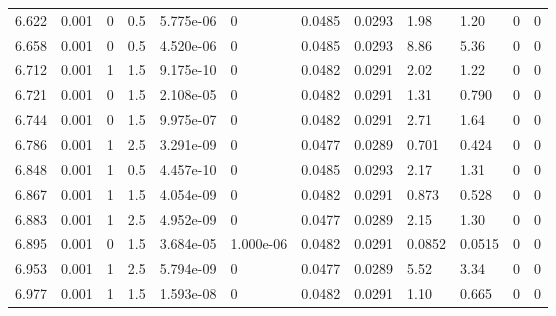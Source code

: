 \documentclass[preview]{standalone}
\begin{document}
{{{{{\begin{tabular}{L{1.2cm}C{1.2cm} C{0.3cm}C{0.5cm} C{1.4cm}C{1.4cm} C{1.4cm}C{1.4cm} C{1.6cm}C{1.6cm} C{1.6cm}C{1.6cm}}
  6.622  &  0.001  & 0     & 0.5 &  5.775e-06  & 0  &  0.0485&   0.0293& 1.98 & 1.20   &  0 & 0  \\ 
  6.658  &  0.001  & 0     & 0.5 &  4.520e-06  & 0  &  0.0485&   0.0293& 8.86 & 5.36   &  0 & 0  \\ 
  6.712  &  0.001  & 1     & 1.5 &  9.175e-10  & 0  &  0.0482&   0.0291& 2.02 & 1.22   &  0 & 0  \\ 
  6.721  &  0.001  & 0     & 1.5 &  2.108e-05  & 0  &  0.0482&   0.0291& 1.31 & 0.790   &  0 & 0  \\ 
  6.744  &  0.001  & 0     & 1.5 &  9.975e-07  & 0  &  0.0482&   0.0291& 2.71 & 1.64   &  0 & 0  \\ 
  6.786  &  0.001  & 1     & 2.5 &  3.291e-09  & 0  &  0.0477&   0.0289& 0.701 & 0.424   &  0 & 0  \\ 
  6.848  &  0.001  & 1     & 0.5 &  4.457e-10  & 0  &  0.0485&   0.0293& 2.17 & 1.31   &  0 & 0  \\ 
  6.867  &  0.001  & 1     & 1.5 &  4.054e-09  & 0  &  0.0482&   0.0291& 0.873 & 0.528   &  0 & 0  \\ 
  6.883  &  0.001  & 1     & 2.5 &  4.952e-09  & 0  &  0.0477&   0.0289& 2.15 & 1.30   &  0 & 0  \\ 
  6.895  &  0.001  & 0     & 1.5 &  3.684e-05  & 1.000e-06  &  0.0482&   0.0291& 0.0852 & 0.0515   &  0 & 0  \\ 
  6.953  &  0.001  & 1     & 2.5 &  5.794e-09  & 0  &  0.0477&   0.0289& 5.52 & 3.34   &  0 & 0  \\ 
  6.977  &  0.001  & 1     & 1.5 &  1.593e-08  & 0  &  0.0482&   0.0291& 1.10 & 0.665   &  0 & 0  \\ 
\hline 
\end{tabular} 

}}}}}
\end{document}
